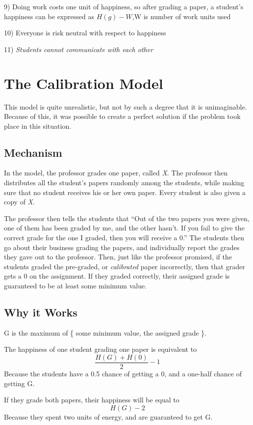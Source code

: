 \documentclass[12pt, Arial]{article}
\begin{document}
9) Doing work costs one unit of happiness, so after grading a paper, a student's happiness can be expressed as $H(g)-W$,W is number of work units used

10) Everyone is risk neutral with respect to happiness

11) \emph{Students cannot communicate with each other}

\section{The Calibration Model}

This model is quite unrealistic, but not by such a degree that it is unimaginable. Because of this, it was possible to create a perfect solution if the problem took place in this situation.

\subsection{Mechanism}
In the model, the professor grades one paper, called \emph{X}. The professor then distributes all the student's papers randomly among the students, while making sure that no student receives his or her own paper. Every student is also given a copy of \emph{X}.


The professor then tells the students that ``Out of the two papers you were given, one of them has been graded by me, and the other hasn't. If you fail to give the correct grade for the one I graded, then you will receive a 0.'' The students then go about their business grading the papers, and individually report the grades they gave out to the professor. Then, just like the professor promised, if the students graded the pre-graded, or \emph{calibrated} paper incorrectly, then that grader gets a 0 on the assignment. If they graded correctly, their assigned grade is guaranteed to be at least some minimum value.

\subsection{Why it Works}
G is the maximum of \{ some minimum value, the assigned grade \}.

The happiness of one student grading one paper is equivalent to $$\frac{H(G)+H(0)}{2}-1$$ Because the students have a 0.5 chance of getting a 0, and a one-half chance of getting G.

If they grade both papers, their happiness will be equal to $$H(G)-2$$Because they spent two units of energy, and are guaranteed to get G.
\end{document}

